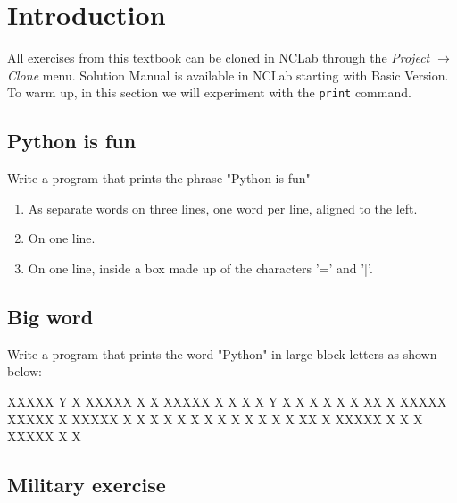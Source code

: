 
\section{Introduction}

All exercises from this textbook can be cloned in NCLab through the {\em Project
$\rightarrow$ Clone} menu. Solution Manual is available in NCLab starting with Basic 
Version. To warm up, in this section we will experiment with the {\tt print} 
command.


\subsection{Python is fun}

Write a program that prints the phrase "Python is fun" 
\begin{enumerate}
\item As separate words on three lines, one word per line, aligned to the left.
\item On one line.
\item On one line, inside a box made up of the characters '=' and '|'.
\end{enumerate}


\subsection{Big word}

Write a program that prints the word "Python" in large block 
letters as shown below:

\begin{bluecode}
XXXXX Y   X XXXXX X   X XXXXX X   X
X   X Y   X   X   X   X X   X XX  X
XXXXX XXXXX   X   XXXXX X   X X X X
X         X   X   X   X X   X X  XX
X     XXXXX   X   X   X XXXXX X   X
\end{bluecode}


\subsection{Military exercise}

